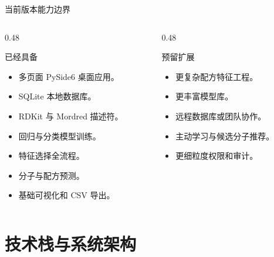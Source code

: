 \documentclass[aspectratio=169,11pt]{beamer}
\newenvironment{templatebox}[1]{%
  \begin{beamerboxesrounded}[upper=block title,lower=block body,shadow=false]{#1}%
  \small
}{%
  \end{beamerboxesrounded}%
}
\begin{document}
\begin{frame}{当前版本能力边界}
  \begin{columns}
    \begin{column}{0.48\textwidth}
      \begin{templatebox}{已经具备}
        \begin{itemize}
          \item 多页面 PySide6 桌面应用。
          \item SQLite 本地数据库。
          \item RDKit 与 Mordred 描述符。
          \item 回归与分类模型训练。
          \item 特征选择全流程。
          \item 分子与配方预测。
          \item 基础可视化和 CSV 导出。
        \end{itemize}
      \end{templatebox}
    \end{column}
    \begin{column}{0.48\textwidth}
      \begin{templatebox}{预留扩展}
        \begin{itemize}
          \item 更复杂配方特征工程。
          \item 更丰富模型库。
          \item 远程数据库或团队协作。
          \item 主动学习与候选分子推荐。
          \item 更细粒度权限和审计。
        \end{itemize}
      \end{templatebox}
    \end{column}
  \end{columns}
\end{frame}

\section{技术栈与系统架构}
\end{document}

